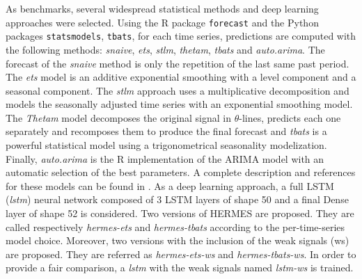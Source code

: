 \documentclass{article} %
\begin{document}
As benchmarks, several widespread statistical methods and deep learning approaches were selected. Using the R package \texttt{forecast} and the Python packages \texttt{statsmodels},  \texttt{tbats}, for each time series, predictions are computed with the following methods: \textit{snaive}, \textit{ets}, \textit{stlm}, \textit{thetam}, \textit{tbats} and \textit{auto.arima}. The forecast of the \textit{snaive} method is only the repetition of the last same past period. The \textit{ets} model is an additive exponential smoothing with a level component and a seasonal component. The \textit{stlm} approach uses a multiplicative decomposition and models the seasonally adjusted time series with an exponential smoothing model. The \textit{Thetam} model decomposes the original signal in $\theta$-lines, predicts each one separately and recomposes them to produce the final forecast and \textit{tbats} is a powerful statistical model using a trigonometrical seasonality modelization. Finally, \textit{auto.arima} is the R implementation of the ARIMA model with an automatic selection of the best parameters. A complete description and references for these models can be found in \citep{hyndman2020package}. As a deep learning approach, a full LSTM (\textit{lstm}) neural network composed of 3 LSTM layers of shape 50 and a final Dense layer of shape 52 is considered.
Two versions of HERMES are proposed. They are called respectively \textit{hermes-ets} and \textit{hermes-tbats} according to the per-time-series model choice.
Moreover, two versions with the inclusion of the weak signals (ws) are proposed. They are referred as \textit{hermes-ets-ws} and \textit{hermes-tbats-ws}. In order to provide a fair comparison, a \textit{lstm} with the weak signals named \textit{lstm-ws} is trained.
\end{document}
